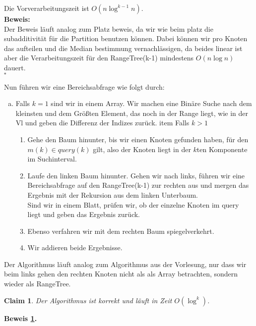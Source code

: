 \documentclass[11pt,a4paper,ngerman]{article}
\newtheorem{lemma}{\bfseries Claim}
\begin{document}
Die Vorverarbeitungszeit ist $O(n \log^{k-1} n)$.\\
\textbf{Beweis:}\\
    Der Beweis läuft analog zum Platz beweis, da wir wie beim platz die subadditivität für
    die Partition benutzen können.
    Dabei können wir pro Knoten das aufteilen und die Median bestimmung vernachlässigen,
    da beides linear ist aber die Verarbeitungszeit für den RangeTree(k-1) mindestens $O(n \log n)$
    dauert.\\
\mbox{}\hfill$\square$

Nun führen wir eine Bereichsabfrage wie folgt durch:
\begin{enumerate}[a.]
    \item Falls $k=1$ sind wir in einem Array. Wir machen eine Binäre Suche nach dem kleinsten
        und dem Größten Element, das noch in der Range liegt, wie in der Vl und geben
        die Differenz der Indizes zurück.
    item Falls $k>1$
\begin{enumerate}[1.]
    \item Gehe den Baum hinunter, bis wir einen Knoten gefunden haben, für den $m(k) \in query(k)$ gilt,
        also der Knoten liegt in der $k$ten Komponente im Suchinterval.
    \item Laufe den linken Baum hinunter. Gehen wir nach links, führen wir eine Bereichsabfrage auf
        den RangeTree(k-1) zur rechten aus und mergen das Ergebnis mit der Rekursion aus dem linken Unterbaum.\\
        Sind wir in einem Blatt, prüfen wir, ob der einzelne Knoten im query liegt und geben das Ergebnis zurück.
    \item Ebenso verfahren wir mit dem rechten Baum spiegelverkehrt.
    \item Wir addieren beide Ergebnisse.
\end{enumerate}
\end{enumerate}

Der Algorithmus läuft analog zum Algorithmus aus der Vorlesung, nur dass wir beim links gehen den rechten Knoten
nicht als als Array betrachten, sondern wieder als RangeTree.

\begin{lemma}\label{alge:ueb10:rangetreecor}
    Der Algorithmus ist korrekt und läuft in Zeit $O(\log^{k})$.
\end{lemma}

\textbf{Beweis \ref{alge:ueb10:rangetreecor}.}\\
\end{document}
